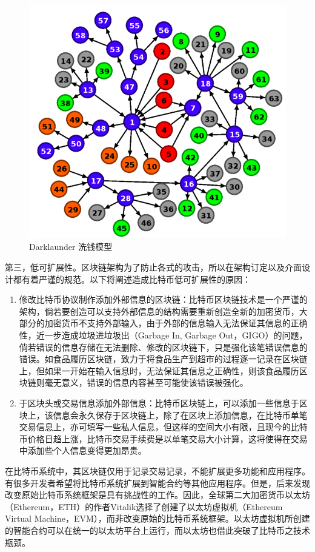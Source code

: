 					\begin{figure}[!htbp]
						\centering
						\includegraphics[width = .6\textwidth]{Darklaunderworkflow.png}
						\caption{Darklaunder 洗钱模型\supercite{AnAnalysisofBitcoinLaundryServices}}\label{Darklaunderworkflow}
					\end{figure}

				第三，低可扩展性。区块链架构为了防止各式的攻击，所以在架构订定以及介面设计都有着严谨的规范。以下将阐述造成比特币低可扩展性的原因：

					\begin{enumerate}

						\item 修改比特币协议制作添加外部信息的区块链：比特币区块链技术是一个严谨的架构，倘若要创造可以支持外部信息的结构需要重新创造全新的加密货币，大部分的加密货币不支持外部输入，由于外部的信息输⼊无法保证其信息的正确性，近一步造成垃圾进垃圾出（Garbage In, Garbage Out，GIGO）的问题，倘若错误的信息存储在无法删除、修改的区块链下，只是强化该笔错误信息的错误。如食品履历区块链，致力于将食品生产到超市的过程逐一记录在区块链上，但如果一开始在输入信息时，无法保证其信息之正确性，则该食品履历区块链则毫无意义，错误的信息内容甚至可能使该错误被强化。

						\item 于区块头或交易信息添加外部信息：比特币区块链上，可以添加一些信息于区块上，该信息会永久保存于区块链上，除了在区块上添加信息，在比特币单笔交易信息上，亦可填写一些私人信息，但这样的空间大小有限，且现今的比特币价格日趋上涨，比特币交易手续费是以单笔交易大小计算，这将使得在交易中添加些个人信息变得更加昂贵。

					\end{enumerate}

				在比特币系统中，其区块链仅用于记录交易记录，不能扩展更多功能和应用程序。有很多开发者希望将比特币系统扩展到智能合约等其他应用程序。但是，后来发现改变原始比特币系统框架是具有挑战性的工作。因此，全球第二大加密货币以太坊（Ethereum，ETH）的作者Vitalik选择了创建了以太坊虚拟机（Ethereum Virtual Machine，EVM），而非改变原始的比特币系统框架。以太坊虚拟机所创建的智能合约可以在统一的以太坊平台上运行，而以太坊也借此突破了比特币之技术瓶颈。
	
